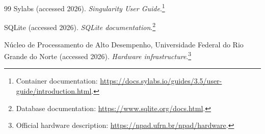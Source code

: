 \documentclass[11pt,a4paper]{article}
\newcommand{\technical}[2]{\footnote{#1: \url{#2}.}}
\begin{document}
\begin{thebibliography}{99}
Sylabs (accessed 2026).
\emph{Singularity User Guide}.\technical{Container documentation}{https://docs.sylabs.io/guides/3.5/user-guide/introduction.html}

SQLite (accessed 2026).
\emph{SQLite documentation}.\technical{Database documentation}{https://www.sqlite.org/docs.html}

N\'ucleo de Processamento de Alto Desempenho, Universidade Federal do Rio Grande do Norte (accessed 2026).
\emph{Hardware infrastructure}.\technical{Official hardware description}{https://npad.ufrn.br/npad/hardware}
\end{thebibliography}
\endgroup
\end{document}
